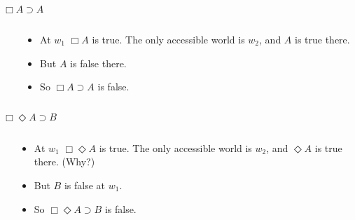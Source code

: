 \documentclass[
  14pt,
  letterpaper,
  ignorenonframetext,
  aspectratio=169,
]{beamer}
\begin{document}
\begin{frame}{\(\Box A \supset A\)}
\protect\hypertarget{box-a-supset-a}{}
\begin{columns}
    \begin{column}{0.45\textwidth}
    \end{column}
    \begin{column}{0.5\textwidth}
    \begin{itemize}
    \item At $w_1$ $\Box A$ is true. The only accessible world is $w_2$, and $A$ is true there.
    \item But $A$ is false there.
    \item So $\Box A \supset A$ is false.
    \end{itemize}
  \end{column}
\end{columns}
\end{frame}

\begin{frame}{\(\Box \Diamond A \supset B\)}
\protect\hypertarget{box-diamond-a-supset-b}{}
\begin{columns}
    \begin{column}{0.45\textwidth}
    \end{column}
    \begin{column}{0.5\textwidth}
    \begin{itemize}
    \item At $w_1$ $\Box \Diamond A$ is true. The only accessible world is $w_2$, and $\Diamond A$ is true there. (Why?)
    \item But $B$ is false at $w_1$.
    \item So $\Box \Diamond A \supset B$ is false.
    \end{itemize}
  \end{column}
\end{columns}
\end{frame}
\end{document}
